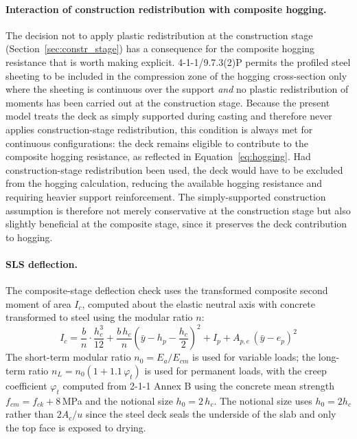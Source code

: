 \paragraph{Interaction of construction redistribution with composite hogging.}
The decision not to apply plastic redistribution at the construction stage (Section~\ref{sec:constr_stage}) has a consequence for the composite hogging resistance that is worth making explicit. 4-1-1/9.7.3(2)P permits the profiled steel sheeting to be included in the compression zone of the hogging cross-section only where the sheeting is continuous over the support \emph{and} no plastic redistribution of moments has been carried out at the construction stage. Because the present model treats the deck as simply supported during casting and therefore never applies construction-stage redistribution, this condition is always met for continuous configurations: the deck remains eligible to contribute to the composite hogging resistance, as reflected in Equation~\eqref{eq:hogging}. Had construction-stage redistribution been used, the deck would have to be excluded from the hogging calculation, reducing the available hogging resistance and requiring heavier support reinforcement. The simply-supported construction assumption is therefore not merely conservative at the construction stage but also slightly beneficial at the composite stage, since it preserves the deck contribution to hogging.

\paragraph{SLS deflection.}
The composite-stage deflection check uses the transformed composite second moment of area $I_c$, computed about the elastic neutral axis with concrete transformed to steel using the modular ratio $n$:
\begin{equation}
    I_c = \frac{b}{n} \cdot \frac{h_c^3}{12} + \frac{b\,h_c}{n}\left(\bar{y} - h_p - \frac{h_c}{2}\right)^2 + I_{p} + A_{p,e}\,(\bar{y} - e_p)^2
    \label{eq:Ic}
\end{equation}
The short-term modular ratio $n_0 = E_a/E_{cm}$ is used for variable loads; the long-term ratio $n_L = n_0(1 + 1.1\,\varphi_t)$ is used for permanent loads, with the creep coefficient $\varphi_t$ computed from 2-1-1 Annex B using the concrete mean strength $f_{cm} = f_{ck} + 8$\,MPa and the notional size $h_0 = 2\,h_c$. The notional size uses $h_0 = 2 h_c$ rather than $2 A_c / u$ since the steel deck seals the underside of the slab and only the top face is exposed to drying.

